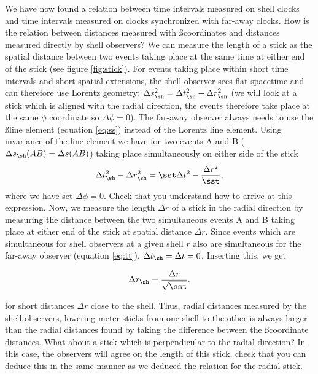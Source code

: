 {\begin{multicols}{2}
We have now found a relation between time intervals measured on shell clocks and time intervals measured on clocks synchronized with far-away clocks. How is the relation between distances measured with \ss coordinates and distances measured directly by shell observers? We can measure the length of a stick as the spatial distance between two events taking place at the same time at either end of the stick (see figure \ref{fig:stick}). For events taking place within short time intervals and short spatial extensions, the shell observer sees flat spacetime and can therefore use Lorentz geometry: \mbox{$\Delta s_\sh^2=\Delta t_\sh^2-\Delta r_\sh^2$} (we will look at a stick which is aligned with the radial direction, the events therefore take place at the same $\phi$ coordinate so $\Delta\phi=0$). The far-away observer always needs to use the \ss line element (equation \ref{eq:ss}) instead of the Lorentz line element. Using invariance of the line element we have for two events A and B \mbox{($\Delta s_\sh(AB)=\Delta s(AB)$)} taking place simultaneously on either side of the stick
\[
\Delta t_\sh^2-\Delta r_\sh^2=\sst \Delta t^2-\frac{\Delta r^2}{\sst},
\]
where we have set $\Delta\phi=0$. Check that you understand how to arrive at this expression. Now, we measure the length $\Delta r$ of a stick in the radial direction by measuring the distance between the two simultaneous events A and B taking place at either end of the stick at spatial distance $\Delta r$. Since events which are simultaneous for shell observers at a given shell $r$ also are simultaneous for the far-away observer (equation \ref{eq:tt}), $\Delta t_\sh=\Delta t=0$. Inserting this, we get
\begin{formbox}
\begin{equation}
\label{eq:rr}
\Delta r_\sh=\frac{\Delta r}{\sqrt{\sst}}.
\end{equation}
\end{formbox}
for short distances $\Delta r$ close to the shell.
Thus, radial distances measured by the shell observers, lowering meter sticks from one shell to the other is always larger than the radial distances found by taking the difference between the \ss coordinate distances. What about a stick which is perpendicular to the radial direction? In this case, the observers will agree on the length of this stick, check that you can deduce this in the same manner as we deduced the relation for the radial stick.


\end{multicols}}
